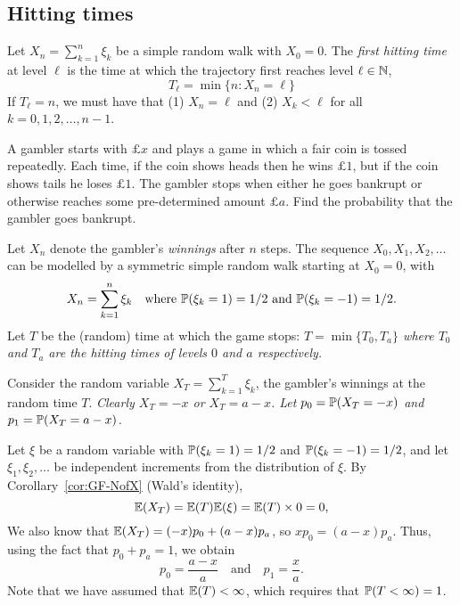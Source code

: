 \subsection{Hitting times}
Let $X_n=\sum_{k=1}^{n}\xi_k$ be a simple random walk with $X_0=0$. The \emph{first hitting time} at level $\ell$ is the time at which the trajectory first reaches level $\ell\in\mathbb{N}$,
\[
T_{\ell} = \min\{n: X_n=\ell\}
\]
If $T_{\ell}=n$, we must have that (1) $X_n = \ell$ and (2) $X_k < \ell$ for all $k=0,1,2,\ldots,n-1$.

\begin{example}
A gambler starts with $\pounds x$ and plays a game in which a fair coin is tossed repeatedly. Each time, if the coin shows heads then he wins $\pounds 1$, but if the coin shows tails he loses $\pounds 1$. The gambler stops when either he goes bankrupt or otherwise reaches some pre-determined amount $\pounds a$. Find the probability that the gambler goes bankrupt.
\end{example}

\begin{solution}
Let $X_n$ denote the gambler's \emph{winnings} after $n$ steps. The sequence $X_0,X_1,X_2,\ldots$ can be modelled by a symmetric simple random walk starting at $X_0=0$, with
\[
X_n = \sum_{k=1}^n \xi_k \quad\text{where $\mathbb{P}(\xi_k=1)=1/2$ and $\mathbb{P}(\xi_k=-1)=1/2$.} 
\]
Let $T$ be the (random) time at which the game stops:
\bit
\it $T=\min\{T_0,T_a\}$ where $T_0$ and $T_a$ are the hitting times of levels $0$ and $a$ respectively.
\eit

Consider the random variable $X_T = \sum_{k=1}^{T}\xi_k$, the gambler's winnings at the random time $T$.
\bit
\it Clearly $X_T = -x$ or $X_T = a-x$. 
\it Let $p_0=\mathbb{P}(X_T = -x)$ and $p_1=\mathbb{P}(X_T = a-x)$. 
\eit

Let $\xi$ be a random variable with $\mathbb{P}(\xi_k=1)=1/2$ and $\mathbb{P}(\xi_k=-1)=1/2$, and let $\xi_1,\xi_2,\ldots$ be independent increments from the distribution of $\xi$. By Corollary~\ref{cor:GF-NofX} (Wald's identity),
\[
\mathbb{E}(X_T) = \mathbb{E}(T)\mathbb{E}(\xi) = \mathbb{E}(T)\times 0 = 0,
\]
We also know that $\mathbb{E}(X_T) = (-x)p_0 + (a-x)p_a$, so $xp_0 = (a-x)p_a$. Thus, using the fact that $p_0+p_a=1$, we obtain
\[
p_0 = \frac{a-x}{a} \quad\text{and}\quad p_1 = \frac{x}{a}.
\] 
Note that we have assumed that $\mathbb{E}(T)<\infty$, which requires that $\mathbb{P}(T<\infty)=1$.

\end{solution}

